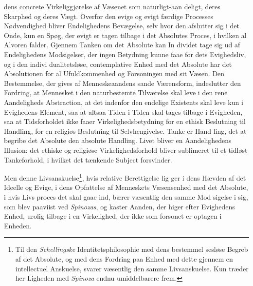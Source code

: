  \setcounter{footnote}{0}%
dens concrete Virkeliggjørelse af Væsenet som naturligt-aan\-%
deligt, deres Skarphed og deres Vægt. Overfor den evige og
evigt færdige Processes Nødvendighed bliver Endelighedens
Bevægelse, selv hvor den afslutter sig i det Onde, kun en Spøg,
der evigt er tagen tilbage i det Absolutes Proces, i hvilken al
Alvoren falder. Gjennem Tanken om det Absolute kan In\-%
dividet tage sig ud af Endelighedens Modsigelser, der ingen
Betydning kunne faae for dets Evighedsliv, og i den indivi\-%
dualitetsløse, contemplative Enhed med det Absolute har det
Absolutionen for al Ufuldkommenhed og Forsoningen med sit
Væsen. Den Bestemmelse, der gives af Menneskeaandens
sande Værensform, indeslutter den Fordring, at Mennesket i
den naturbestemte Tilværelse skal leve i den rene Aandeligheds
Abstraction, at det indenfor den endelige Existents skal leve
kun i Evighedens Element, saa at altsaa Tiden i Tiden skal
tages tilbage i Evigheden, saa at Tidsforholdet ikke faaer
Virkelighedsbetydning for en ethisk Beslutning til Handling,
for en religiøs Beslutning til Selvhengivelse. Tanke er Hand\-%
ling, det at begribe det Absolute den absolute Handling. Livet
bliver en Aandelighedens Illusion: det ethiske og religiøse
Virkelighedsforhold bliver sublimeret til et tidløst Tankeforhold,
i hvilket det tænkende Subject forsvinder.

Men denne Livsanskuelse\footnote{Til den \emph{Schellingske} Identitetsphilosophie med dens bestemmel\-%
sesløse Begreb af det Absolute, og med dens Fordring paa Enhed
med dette gjennem en intellectuel Anskuelse, svarer væsentlig den
samme Livsanskuelse. Kun træder her Ligheden med \emph{Spinoza}
endnu umiddelbarere frem.}, hvis relative Berettigelse lig\-%
ger i dens Hævden af det Ideelle og Evige, i dens Opfattelse
af Menneskets Væsensenhed med det Absolute, i hvis Livs\-%
proces det skal gaae ind, bærer væsentlig den samme Mod\-%
sigelse i sig, som blev paaviist ved \emph{Spinozas}, og kaster
Aanden, der higer efter Evighedens Enhed, urolig tilbage i en
Virkelighed, der ikke som forsonet er optagen i Enheden.

\divrule

